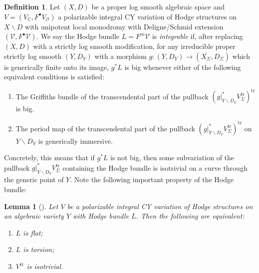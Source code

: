 \documentclass{amsart}
\newcommand{\bs}{\backslash}
\newtheorem{lem}[theorem]{Lemma}
\theoremstyle{definition}
\newtheorem{defn}[theorem]{Definition}
\theoremstyle{remark}
\def\bC{\mathbb{C}}
\def\cO{\mathcal{O}}
\def\cV{\mathcal{V}}
\def\trans{\mathrm{tr}}
\def\pmax{m}
\numberwithin{equation}{section}
\begin{document}
\begin{defn}\label{defn:integrable}  Let $(X,D)$ be a proper log smooth algebraic space and $V=(V_\bC,F^\bullet V_\cO)$ a polarizable integral CY variation of Hodge structures on $X\bs D$ with unipotent local monodromy with Deligne/Schmid extension $(\cV,F^\bullet\cV)$.  We say the Hodge bundle $L=F^\pmax\cV$ is \emph{integrable} if, after replacing $(X,D)$ with a strictly log smooth modification, for any irreducible proper strictly log smooth $(Y,D_Y)$ with a morphism $g\colon (Y,D_Y)\to (\overline{X_\Sigma},D_\Sigma)$ which is generically finite onto its image, $g^*L$ is big whenever either of the following equivalent conditions is satisfied:
\begin{enumerate}
\item The Griffiths bundle of the transcendental part of the pullback $(g|_{Y\bs D_Y}^*V^\trans_\Sigma)^\trans$ is big.

\item The period map of the transcendental part of the pullback $(g|_{Y\bs D_Y}^*V^\trans_\Sigma)^\trans$ on $Y\bs D_Y$ is generically immersive.

\end{enumerate}
\end{defn}
Concretely, this means that if $g^*L$ is not big, then some subvariation of the pullback $g|_{Y\bs D_Y}^*V^\trans_\Sigma$ containing the Hodge bundle is isotrivial on a curve through the generic
point of $Y$.  Note the following important property of the Hodge bundle:

\begin{lem}[{\cite[Cor. 4.2.8.(iii).(b)]{DeligneII}}]\label{lem:deligne}Let $V$ be a polarizable integral CY variation of Hodge structures on an algebraic variety $Y$ with Hodge bundle $L$.  Then the following are equivalent:
\begin{enumerate}
\item $L$ is flat;
\item $L$ is torsion;
\item $V^\trans$ is isotrivial.
\end{enumerate}
\end{lem}
\end{document}
